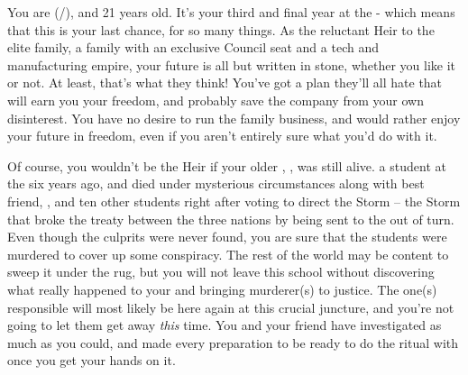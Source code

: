 \documentclass[char]{GL2020}
\begin{document}
\name{\cHeir{}}

You are \cHeir{\full} (\cHeir{\they}/\cHeir{\them}), and 21 years old.  It's your third and final year at the \pSchool{} - which means that this is your last chance, for so many things.  As the reluctant Heir to the elite \cHeir{\formal} family, a family with an exclusive Council seat and a tech and manufacturing empire, your future is all but written in stone, whether you like it or not. At least, that's what they think! You've got a plan they'll all hate that will earn you your freedom, and probably save the company from your own disinterest. You have no desire to run the family business, and would rather enjoy your future in freedom, even if you aren't entirely sure what you'd do with it.

Of course, you wouldn't be the \cHeir{\formal} Heir if your older \cHeirSibling{\sibling}, \cHeirSibling{\full}, was still alive. \cHeirSibling{\They} \cHeirSibling{\were} a student at the \pSchool{} six years ago, and died under mysterious circumstances along with \cHeirSibling{\their} best friend, \cKidScientist{\full}, and ten other students right after voting to direct the Storm – the Storm that broke the treaty between the three nations by being sent to the \pShip{} out of turn. Even though the culprits were never found, you are sure that the students were murdered to cover up some conspiracy. The rest of the world may be content to sweep it under the rug, but you will not leave this school without discovering what really happened to your \cHeirSibling{\sibling} and bringing \cHeirSibling{\their} murderer(s) to justice. The one(s) responsible will most likely be here again at this crucial juncture, and you're not going to let them get away \emph{this} time. You and your friend \cPresident{\full} have investigated as much as you could, and made every preparation to be ready to do the ritual with \iMirror{} once you get your hands on it.
\end{document}
